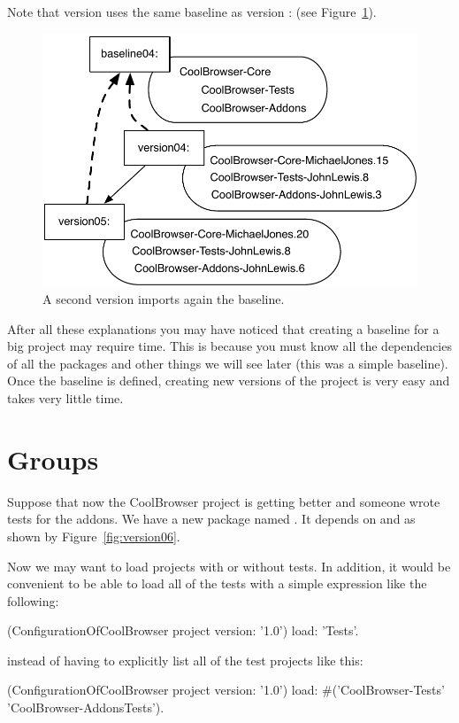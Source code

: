 \documentclass[a4paper,10pt,twoside]{book}
\begin{document}
Note that version  uses the same baseline as version :  (see Figure~\ref{fig:version05}).

\begin{figure}
\begin{center}
\includegraphics[width=0.6\linewidth]{version05}
\caption{A second version imports again the baseline.}\label{fig:version05}
\end{center}
\end{figure} 

After all these explanations you may have noticed that creating a baseline for a big project may require time. This is because you must know all the dependencies of all the packages and other things we will see later (this was a simple baseline). Once the baseline is defined, creating new versions of the project is very easy and takes very little time. 

\section{Groups}
Suppose that now the CoolBrowser project is getting better and someone wrote tests for the addons. We have a new package named . It depends on  and  as shown by Figure~\ref{fig:version06}.

Now we may want to load projects with or without tests. In addition, it would be convenient to be able to load all of the tests with a simple expression like the following:

\begin{code}{}
(ConfigurationOfCoolBrowser project version: '1.0') load: 'Tests'.
\end{code}

instead of having to explicitly list all of the test projects like this:
 
\begin{code}{} 
(ConfigurationOfCoolBrowser project version: '1.0') 
	load: #('CoolBrowser-Tests' 'CoolBrowser-AddonsTests').
\end{code}
 
\end{document}
